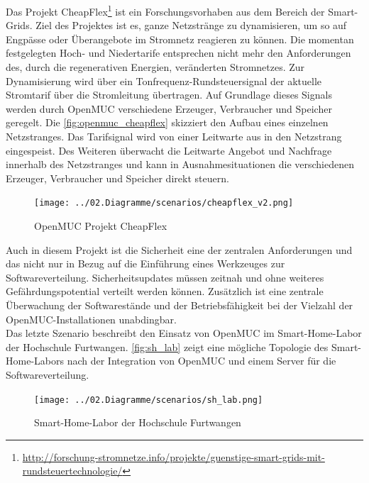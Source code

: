 Das Projekt CheapFlex\footnote{\url{http://forschung-stromnetze.info/projekte/guenstige-smart-grids-mit-rundsteuertechnologie/}} ist ein Forschungsvorhaben aus dem Bereich der Smart-Grids.
Ziel des Projektes ist es, ganze Netzstränge zu dynamisieren, um so auf Engpässe oder Überangebote im Stromnetz reagieren zu können. 
Die momentan festgelegten Hoch- und Niedertarife entsprechen nicht mehr den Anforderungen des, durch die regenerativen Energien, veränderten Stromnetzes.
Zur Dynamisierung wird über ein Tonfrequenz-Rundsteuersignal der aktuelle Stromtarif über die Stromleitung übertragen.
Auf Grundlage dieses Signals werden durch OpenMUC verschiedene Erzeuger, Verbraucher und Speicher geregelt.
Die \autoref{fig:openmuc_cheapflex} skizziert den Aufbau eines einzelnen Netzstranges.
Das Tarifsignal wird von einer Leitwarte aus in den Netzstrang eingespeist. Des Weiteren überwacht die Leitwarte Angebot und Nachfrage innerhalb des Netzstranges
und kann in Ausnahmesituationen die verschiedenen Erzeuger, Verbraucher und Speicher direkt steuern.

\begin{figure}[h]
 \centering
 \texttt{[image: ../02.Diagramme/scenarios/cheapflex\_v2.png]}
 \caption{OpenMUC Projekt CheapFlex}
 \label{fig:openmuc_cheapflex}
\end{figure}

Auch in diesem Projekt ist die Sicherheit eine der zentralen Anforderungen und das nicht nur in Bezug auf die Einführung eines Werkzeuges zur Softwareverteilung.
Sicherheitsupdates müssen zeitnah und ohne weiteres Gefährdungspotential verteilt werden können.
Zusätzlich ist eine zentrale Überwachung der Softwarestände und der Betriebsfähigkeit bei der Vielzahl der OpenMUC-Installationen unabdingbar.\\

Das letzte Szenario beschreibt den Einsatz von OpenMUC im Smart-Home-Labor der Hochschule Furtwangen.
\autoref{fig:sh_lab} zeigt eine mögliche Topologie des Smart-Home-Labors nach der Integration von OpenMUC und einem Server für die Softwareverteilung.

\begin{figure}[h]
 \centering
 \texttt{[image: ../02.Diagramme/scenarios/sh\_lab.png]}
 \caption{Smart-Home-Labor der Hochschule Furtwangen}
 \label{fig:sh_lab}
\end{figure}

